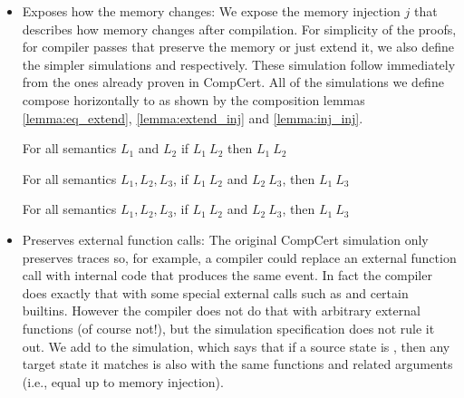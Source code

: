 \begin{itemize}
\item Exposes how the memory changes: We expose the memory injection $j$ that describes how memory changes after compilation. For simplicity of the proofs, for compiler passes that preserve the memory or just extend it, we also define the simpler simulations   and  respectively. These simulation follow immediately from the ones already proven in CompCert. All of the simulations we define compose horizontally to  as shown by the composition lemmas \ref{lemma:eq_extend}, \ref{lemma:extend_inj} and \ref{lemma:inj_inj}.

\begin{lemma}\label{lemma:eq_extend}
For all semantics $L_1$ and $L_2$ if  $L_1 \ L_2$ then  $L_1 \ L_2$\end{lemma} 
\begin{lemma}\label{lemma:extend_inj}
For all semantics $L_1, L_2, L_3$, if  $L_1 \ L_2$ and  $L_2 \ L_3$, then  $L_1 \ L_3$
\end{lemma} 
\begin{lemma}\label{lemma:inj_inj}
For all semantics $L_1, L_2, L_3$, if  $L_1 \ L_2$ and  $L_2 \ L_3$, then  $L_1 \ L_3$
\end{lemma} 


\item Preserves external function calls: The original CompCert simulation only preserves traces so, for example, a compiler could replace an external function call with internal code that produces the same event. In fact the compiler does exactly that with some special external calls such as  and certain builtins. However the compiler does not do that with arbitrary external functions (of course not!), but the simulation specification does not rule it out.  We add  to the simulation, which says that if a source state is , then any target state it matches is also  with the same functions and related arguments (i.e., equal up to memory injection).  


\end{itemize}
